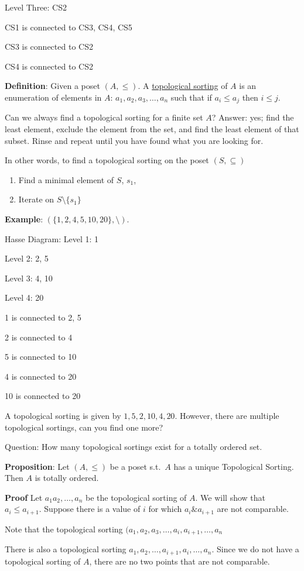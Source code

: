 \documentclass{article}
\begin{document}
    Level Three: CS2
    
    CS1 is connected to CS3, CS4, CS5
    
    CS3 is connected to CS2
    
    CS4 is connected to CS2
    
    \vspace{1.5mm}
    \textbf{Definition}: Given a poset $(A, \le)$. A \underline{topological sorting} of $A$ is an enumeration of elements in $A$: $a_{1}, a_{2}, a_{3}, \dots, a_{n}$ such that if $a_{i} \le a_{j}$ then $i \le j$.
    
    Can we always find a topological sorting for a finite set $A$? Answer: yes; find the least element, exclude the element from the set, and find the least element of that subset. Rinse and repeat until you have found what you are looking for.
    
    In other words, to find a topological sorting on the poset $(S, \subseteq)$
    
    \begin{enumerate}
        \item Find a minimal element of $S$, $s_{1}$,
        \item Iterate on $S \setminus \{s_{1}\}$
    \end{enumerate}
    
    \vspace{1.5mm}
\textbf{Example}: $(\{1, 2, 4, 5, 10, 20\}, \setminus)$.

Hasse Diagram: 
    Level 1: 1
    
    Level 2: 2, 5
    
    Level 3: 4, 10
    
    Level 4: 20
    
    1 is connected to 2, 5
    
    2 is connected to 4
    
    5 is connected to 10
    
    4 is connected to 20
    
    10 is connected to 20
    
    A topological sorting is given by $1, 5, 2, 10, 4, 20$. However, there are multiple topological sortings, can you find one more?

    Question: How many topological sortings exist for a totally ordered set.
    
    \vspace{1.5mm}
    \textbf{Proposition}: Let $(A, \le)$ be a poset s.t.\ $A$ has a unique Topological Sorting. Then $A$ is totally ordered.
    
    \textbf{Proof} Let $a_{1} a_{2}, \dots, a_{n}$ be the topological sorting of $A$. We will show that $a_{i} \le a_{i + 1}$. Suppose there is a value of $i$ for which $a_{i} \& a_{i + 1}$ are not comparable.
    
    Note that the topological sorting $(a_{1}, a_{2}, a_{3}, \dots, a_{i}, a_{i + 1}, \dots, a_{n}$
    
    There is also a topological sorting $a_{1}, a_{2}, \dots, a_{i + 1}, a_{i}, \dots, a_{n}$. Since we do not have a topological sorting of $A$, there are no two points that are not comparable.
\end{document}
